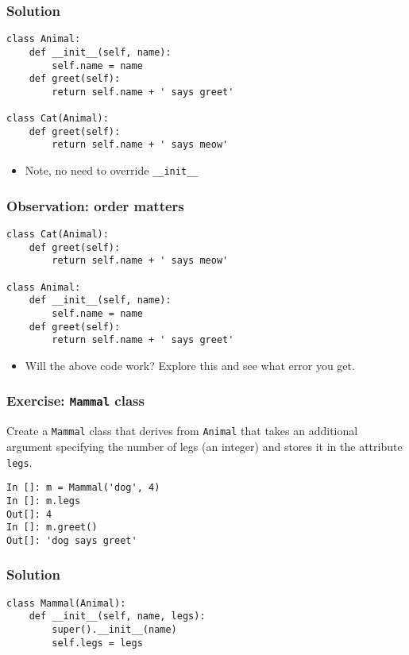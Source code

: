 \documentclass[14pt,compress,aspectratio=169]{beamer}
\begin{document}
\begin{frame}
  \frametitle{Solution}
\begin{lstlisting}
class Animal:
    def __init__(self, name):
        self.name = name
    def greet(self):
        return self.name + ' says greet'

class Cat(Animal):
    def greet(self):
        return self.name + ' says meow'
\end{lstlisting}
  \begin{itemize}
  \item Note, no need to override \lstinline{__init__}
  \end{itemize}
\end{frame}

\begin{frame}
  \frametitle{Observation: order matters}
\begin{lstlisting}
class Cat(Animal):
    def greet(self):
        return self.name + ' says meow'

class Animal:
    def __init__(self, name):
        self.name = name
    def greet(self):
        return self.name + ' says greet'

\end{lstlisting}
  \begin{itemize}
  \item Will the above code work? Explore this and see what error you get.
  \end{itemize}
\end{frame}


\begin{frame}
  \frametitle{Exercise: \lstinline{Mammal} class}
  \begin{block}{}
    Create a \lstinline{Mammal} class that derives from \lstinline{Animal}
    that takes an additional argument specifying the number of legs (an
    integer) and stores it in the attribute \lstinline{legs}.
  \end{block}

\begin{lstlisting}
In []: m = Mammal('dog', 4)
In []: m.legs
Out[]: 4
In []: m.greet()
Out[]: 'dog says greet'
\end{lstlisting}
\end{frame}


\begin{frame}
  \frametitle{Solution}
\begin{lstlisting}
class Mammal(Animal):
    def __init__(self, name, legs):
        super().__init__(name)
        self.legs = legs
\end{lstlisting}
\end{frame}
\end{document}
